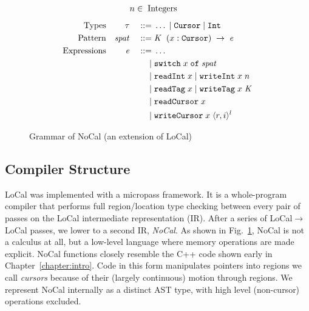 \documentclass[showabstract,showacknowledgments,showpreface,showdedication,school]{iuphd}
\theoremstyle{nonumberplain}
\newcommand{\sysname}[0]{LoCal\xspace}
\newcommand{\ourcalc}[0]{\sysname}
\newcommand{\lamcur}[0]{NoCal\xspace}
\newcommand{\gramdef}{\; ::= \;}
\newcommand{\gramor}{\; | \;}
\newcommand{\keywd}[1]{\mathit{#1}}
\newcommand{\gramwd}[1]{\texttt{#1}}
\newcommand{\DC}{\keywd{K}}
\newcommand{\EXPR}{\keywd{e}}
\newcommand{\TYP}{\keywd{\tau}}
\newcommand{\var}{\svar}
\newcommand{\svar}{x}
\newcommand{\concreteloc}[3]{\ensuremath{\langle #1, #2 \rangle ^{#3}}}
\newcommand{\caseclause}[2]{#1 \;\rightarrow \;#2}
\newcommand{\spat}{\keywd{spat}}
\newcommand{\switch}[2]{\gramwd{switch}\; #1 \;\gramwd{of}\;#2}
\newcommand{\readInt}[1]{\gramwd{\text{readInt}} \; #1}
\newcommand{\writeInt}[2]{\gramwd{\text{writeInt}} \; #1 \; #2}
\newcommand{\readTag}[1]{\gramwd{\text{readTag}} \; #1}
\newcommand{\writeTag}[2]{\gramwd{\text{writeTag}} \; #1 \; #2}
\newcommand{\readCursor}[1]{\gramwd{\text{readCursor}} \; #1}
\newcommand{\writeCursor}[2]{\gramwd{\text{writeCursor}} \; #1 \; #2}
\newcommand{\datacon}[3]{\ensuremath{#1 \;#2 \;#3}}
\newcommand{\captionscrunch}{}
\newcommand{\captionscrunch}{\vspace{-3mm}}
\newcommand{\figref}[1]{Fig.~\ref{#1}}
\begin{document}
\begin{figure}
  \begin{displaymath}
    \begin{aligned}
      &n \in \; \textup{Integers}
    \end{aligned}
  \end{displaymath}
  \begin{displaymath}
    \begin{aligned}
      \textup{Types} && \TYP && \gramdef & \ldots \gramor \gramwd{Cursor} \gramor \gramwd{Int} \\
      \textup{Pattern} && \spat && \gramdef & \caseclause{\datacon{\DC}{}{(\var : \gramwd{Cursor})}}{\EXPR} \\
      \textup{Expressions} && \EXPR && \gramdef & \dots \\
      && && \gramor & \switch{\var}{\spat}\\
      && && \gramor & \readInt{\var} \gramor \writeInt{\var}{n} \\
      && && \gramor & \readTag{\var} \gramor \writeTag{\var}{\DC} \\
      && && \gramor & \readCursor{\var} \\
      && && \gramor & \writeCursor{\var}{\concreteloc{r}{i}{l}} \\
    \end{aligned}
  \end{displaymath}
  \normalsize
  \caption{{Grammar of \lamcur{} (an extension of \ourcalc{}) \captionscrunch}}
  \label{fig:nocal-grammar}
\end{figure}

\subsection{Compiler Structure}\label{subsec:compiler_structure}
\ourcalc was implemented with a micropass framework. It is a whole-program
compiler that performs full region/location type checking
between every pair of passes on the \ourcalc intermediate representation (IR).
After a series of \ourcalc$\rightarrow$\ourcalc passes, we lower to a second IR,
\emph{\lamcur}.
As shown in \figref{fig:nocal-grammar},
\lamcur is not a calculus at all, but a low-level language where
memory operations are made explicit.  \lamcur{} functions closely resemble the C++
code shown early in Chapter~\ref{chapter:intro}.
Code in this form manipulates pointers into regions we call {\em cursors} because of
their (largely continuous) motion through regions.
{We represent \lamcur internally as a
  distinct AST type, with high level (non-cursor) operations excluded.}
\end{document}
